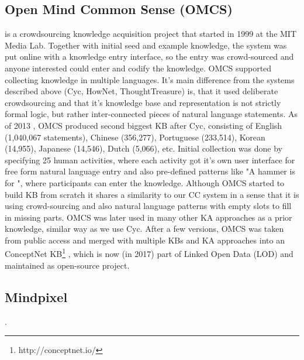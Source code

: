 \subsection{Open Mind Common Sense (OMCS)} is a crowdsourcing knowledge acquisition 
project that started in 1999 at the MIT Media Lab\parencite{Singh2002a}. 
Together with initial seed and example knowledge, the system was put online with
a knowledge entry interface, so the entry was crowd-sourced and anyone 
interested could enter and codify the knowledge. OMCS supported collecting 
knowledge in multiple languages. It's main difference from the systems described
above (Cyc, HowNet, ThoughtTreasure) is, that it used deliberate crowdsourcing
and that it's knowledge base and representation is not strictly formal logic, 
but rather inter-connected pieces of natural language statements. As of 2013 
\parencite{Zang2013}, OMCS produced second biggest KB after Cyc, consisting of 
English (1,040,067 statements), Chinese (356,277), Portuguese (233,514), 
Korean (14,955), Japanese (14,546), Dutch (5,066), etc. Initial collection was
done by specifying 25 human activities, where each activity got it's own user 
interface for free form natural language entry and also pre-defined patterns 
like "A hammer is for \underline{\hspace{1.5cm}}", where participants can enter
the knowledge. Although OMCS started to build KB from scratch it shares a 
similarity to our CC system in a sense that it is using crowd-sourcing and also
natural language patterns with empty slots to fill in missing parts. OMCS was
later used in many other KA approaches as a prior knowledge, similar way as we 
use Cyc. After a few versions, OMCS was taken from public access and merged with
multiple KBs and KA approaches into an ConceptNet 
KB\footnote{http://conceptnet.io/} \parencite{Speer2016}, which is now (in 2017)
part of Linked Open Data (LOD) and maintained as open-source project.

\subsection{Mindpixel}. 
 
